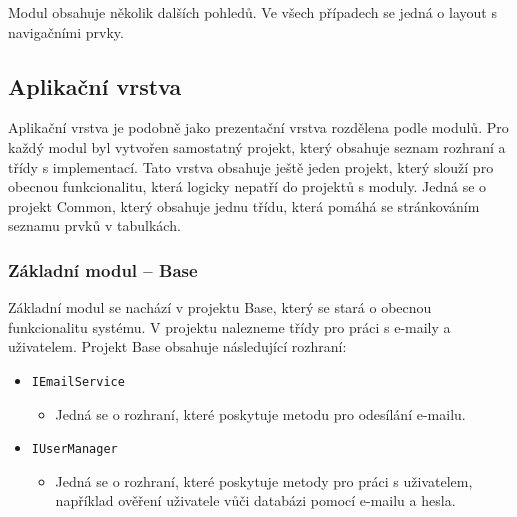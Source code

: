 Modul obsahuje několik dalších pohledů. Ve všech případech se jedná o layout s navigačními prvky. 


\subsection{Aplikační vrstva}
Aplikační vrstva je podobně jako prezentační vrstva rozdělena podle modulů. Pro každý modul byl vytvořen samostatný projekt, který obsahuje seznam rozhraní a třídy s implementací. Tato vrstva obsahuje ještě jeden projekt, který slouží pro obecnou funkcionalitu, která logicky nepatří do projektů s moduly. Jedná se o projekt Common, který obsahuje jednu třídu, která pomáhá se stránkováním seznamu prvků v tabulkách.

\subsubsection{Základní modul -- Base}
Základní modul se nachází v projektu Base, který se stará o obecnou funkcionalitu systému. V projektu nalezneme třídy pro práci s e-maily a uživatelem. Projekt Base obsahuje následující rozhraní:
\begin{itemize}
    \item \texttt{IEmailService}
    \begin{itemize}
        \item Jedná se o rozhraní, které poskytuje metodu pro odesílání e-mailu.
    \end{itemize}
    
    \item \texttt{IUserManager}
    \begin{itemize}
        \item Jedná se o rozhraní, které poskytuje metody pro práci s uživatelem, například ověření uživatele vůči databázi pomocí e-mailu a hesla.
    \end{itemize}
\end{itemize}

